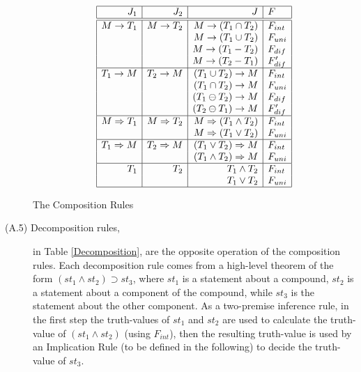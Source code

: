 \begin{description}
\begin{table}[htb]
\[\begin{array}{|r|r|r|l|} \hline
J_1 & J_2 & J & F \\
\hline \hline
M \rightarrow T_1 & M \rightarrow T_2 & M \rightarrow (T_1 \cap T_2) & F_{int} \\
                  &                   & M \rightarrow (T_1 \cup T_2) & F_{uni} \\
                  &                   & M \rightarrow (T_1 - T_2) & F_{dif} \\
                  &                   & M \rightarrow (T_2 - T_1) & F'_{dif} \\
\hline
T_1 \rightarrow M & T_2 \rightarrow M & (T_1 \cup T_2) \rightarrow M & F_{int} \\
                  &                   & (T_1 \cap T_2) \rightarrow M & F_{uni} \\
                  &                   & (T_1 \ominus T_2) \rightarrow M & F_{dif} \\
                  &                   & (T_2 \ominus T_1) \rightarrow M & F'_{dif} \\
\hline
M \Rightarrow T_1 & M \Rightarrow T_2 & M \Rightarrow (T_1 \wedge T_2) & F_{int} \\
                  &                   & M \Rightarrow (T_1 \vee T_2) & F_{uni} \\
\hline
T_1 \Rightarrow M & T_2 \Rightarrow M & (T_1 \vee T_2) \Rightarrow M & F_{int} \\
                  &                   & (T_1 \wedge T_2) \Rightarrow M & F_{uni} \\
\hline
T_1 & T_2 & T_1 \wedge T_2 & F_{int} \\
    &     & T_1 \vee T_2 & F_{uni} \\
\hline
\end{array}\]
\caption{The Composition Rules}
\label{Composition-Rules}
\end{table}

  \item[(A.5) Decomposition rules,] in Table \ref{Decomposition}, are the opposite operation of the composition rules.  Each decomposition rule comes from a high-level theorem of the form \((st_1 \wedge st_2) \supset st_3\), where $st_1$ is a statement about a compound, $st_2$ is a statement about a component of the compound, while $st_3$ is the statement about the other component. As a two-premise inference rule, in the first step the truth-values of $st_1$ and $st_2$ are used to calculate the truth-value of \((st_1 \wedge st_2)\) (using $F_{int}$), then the resulting truth-value is used by an Implication Rule (to be defined in the following) to decide the truth-value of $st_3$. 


\end{description}
